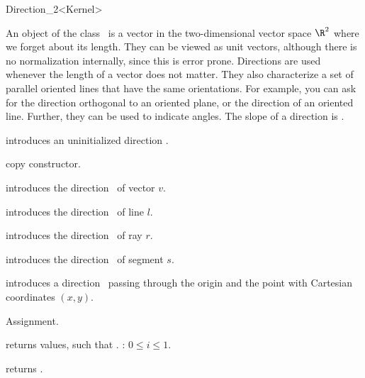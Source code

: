 \begin{ccRefClass} {Direction_2<Kernel>}

\ccDefinition
An object of the class \ccRefName\ is a vector in the two-dimensional 
vector space $\R^2$  where we forget about its length. They can be
viewed as unit vectors, although there is no normalization internally,
since this is error prone.  Directions are used whenever the length of
a vector does not matter. 
They also characterize a set of parallel oriented lines that have the same
orientations.  
For example, you can ask for the direction
orthogonal to an oriented plane, or the direction of an oriented line.
Further, they can be used to indicate angles. The slope of a direction
is .


\ccCreation
{}


\ccHidden {}
             {introduces an uninitialized direction \ccVar.}

\ccHidden {}
            {copy constructor.}

            {introduces the direction \ccVar\ of vector $v$.}

            {introduces the direction \ccVar\ of line $l$.}

            {introduces the direction \ccVar\ of ray $r$.}

            {introduces the direction \ccVar\ of segment $s$.}

            {introduces a direction \ccVar\ passing through the origin
             and the point with Cartesian coordinates $(x, y)$.}


\ccOperations

\ccHidden {}
        {Assignment.}

       {returns values, such that \ccVar {}.
        \ccPrecond: $0 \leq i \leq 1$.}

       {returns .}


\end{ccRefClass}
